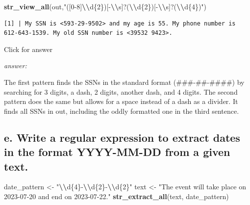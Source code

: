\documentclass[
]{book}
\newenvironment{Shaded}{\begin{snugshade}}{\end{snugshade}}
\newcommand{\FunctionTok}[1]{\textcolor[rgb]{0.13,0.29,0.53}{\textbf{#1}}}
\newcommand{\NormalTok}[1]{#1}
\newcommand{\OtherTok}[1]{\textcolor[rgb]{0.56,0.35,0.01}{#1}}
\newcommand{\SpecialCharTok}[1]{\textcolor[rgb]{0.81,0.36,0.00}{\textbf{#1}}}
\newcommand{\StringTok}[1]{\textcolor[rgb]{0.31,0.60,0.02}{#1}}
\begin{document}
\begin{Shaded}
\begin{Highlighting}[]
\FunctionTok{str\_view\_all}\NormalTok{(out,}\StringTok{"([0{-}8]}\SpecialCharTok{\textbackslash{}\textbackslash{}}\StringTok{d\{2\})[{-}}\SpecialCharTok{\textbackslash{}\textbackslash{}}\StringTok{s]?(}\SpecialCharTok{\textbackslash{}\textbackslash{}}\StringTok{d\{2\})[{-}}\SpecialCharTok{\textbackslash{}\textbackslash{}}\StringTok{s]?(}\SpecialCharTok{\textbackslash{}\textbackslash{}}\StringTok{d\{4\})"}\NormalTok{)}
\end{Highlighting}
\end{Shaded}

\begin{verbatim}
[1] | My SSN is <593-29-9502> and my age is 55. My phone number is 612-643-1539. My old SSN number is <39532 9423>.
\end{verbatim}

Click for answer

\emph{answer:}

The first pattern finds the SSNs in the standard format (\#\#\#-\#\#-\#\#\#\#) by searching for 3 digits, a dash, 2 digits, another dash, and 4 digits. The second pattern does the same but allows for a space instead of a dash as a divider. It finds all SSNs in out, including the oddly formatted one in the third sentence.

\hypertarget{e.-write-a-regular-expression-to-extract-dates-in-the-format-yyyy-mm-dd-from-a-given-text.}{%
\subsection{e. Write a regular expression to extract dates in the format YYYY-MM-DD from a given text.}\label{e.-write-a-regular-expression-to-extract-dates-in-the-format-yyyy-mm-dd-from-a-given-text.}}

\begin{Shaded}
\begin{Highlighting}[]
\NormalTok{date\_pattern }\OtherTok{\textless{}{-}} \StringTok{"}\SpecialCharTok{\textbackslash{}\textbackslash{}}\StringTok{d\{4\}{-}}\SpecialCharTok{\textbackslash{}\textbackslash{}}\StringTok{d\{2\}{-}}\SpecialCharTok{\textbackslash{}\textbackslash{}}\StringTok{d\{2\}"}
\NormalTok{text }\OtherTok{\textless{}{-}} \StringTok{"The event will take place on 2023{-}07{-}20 and end on 2023{-}07{-}22."}
\FunctionTok{str\_extract\_all}\NormalTok{(text, date\_pattern)}
\end{Highlighting}
\end{Shaded}
\end{document}

